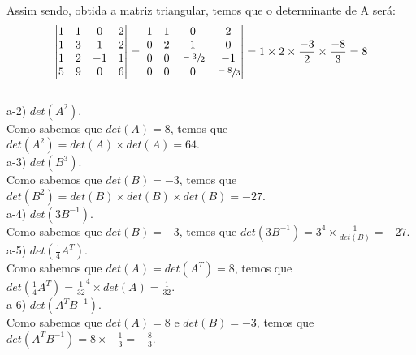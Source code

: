 Assim sendo, obtida a matriz triangular, temos que o determinante de A será:
\\

\begin{equation}
    \left|\begin{matrix}
        1 & 1 & 0  & 2 \\
        1 & 3 & 1  & 2 \\
        1 & 2 & -1 & 1 \\
        5 & 9 & 0  & 6
    \end{matrix}\right| =
    \left|\begin{matrix}
        1 & 1 & 0             & 2             \\
        0 & 2 & 1             & 0             \\
        0 & 0 & \sfrac{-3}{2} & -1            \\
        0 & 0 & 0             & \sfrac{-8}{3}
    \end{matrix}\right|= 1\times 2 \times \frac{-3}{2} \times \frac{-8}{3} = 8
\end{equation}
\\

a-2) $det(A^2)$.
\\

Como sabemos que $det(A) = 8$, temos que \textcolor{COLOR2}{$det(A^2) = det(A)\times det(A) = 64$}.\\

a-3) $det(B^3)$.
\\

Como sabemos que $det(B) = -3$, temos que \textcolor{COLOR2}{$det(B^2) = det(B)\times det(B) \times det(B) = -27$}.\\

a-4) $det(3B^{-1})$.
\\

Como sabemos que $det(B) = -3$, temos que \textcolor{COLOR2}{$det(3B^{-1}) = 3^4\times \frac{1}{det(B)} = -27$}.\\

a-5) $det(\frac{1}{4}A^T)$.
\\

Como sabemos que $det(A) =det(A^T) = 8$, temos que \textcolor{COLOR2}{$det(\frac{1}{4}A^T) ={\frac{1}{32}}^4 \times det(A) = \frac{1}{32}$}.\\

a-6) $det(A^TB^{-1})$.
\\

Como sabemos que $det(A) = 8$ e $det(B) = -3$, temos que \textcolor{COLOR2}{$det(A^TB^{-1})=8\times -\frac{1}{3} = -\frac{8}{3}$}.\\

